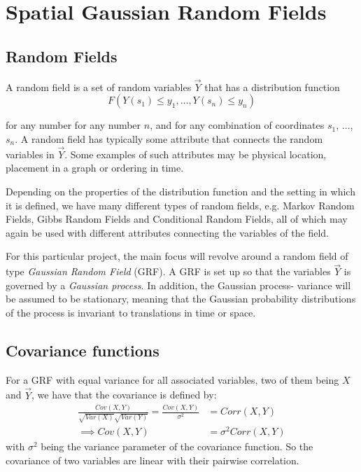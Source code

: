 \section{Spatial Gaussian Random Fields}
\subsection{Random Fields}
A random field is a set of random variables $\vec{Y}$ that has a distribution function 
\begin{equation} \label{eq:distribution_function}
F(Y(s_1) \leq y_1, \dots , Y(s_n) \leq y_n)
\end{equation} 

for any number for any number $n$, and for any combination of coordinates $s_1$, $\ldots$, $s_n$. A random field has typically some attribute that connects the random variables in $\vec{Y}$. Some examples of such attributes may be physical location, placement in a graph or ordering in time.

Depending on the properties of the distribution function and the setting in which it is defined, we have many different types of random fields, e.g. Markov Random Fields, Gibbs Random Fields and Conditional Random Fields, all of which may again be used with different attributes connecting the variables of the field. 

For this particular project, the main focus will revolve around a random field of type \textit{Gaussian Random Field} (GRF). A GRF is set up so that the variables $\vec{Y}$ is governed by a \textit{Gaussian process}. In addition, the Gaussian process- variance will be assumed to be stationary, meaning that the Gaussian probability distributions of the process is invariant to translations in time or space.

\subsection{Covariance functions} \label{sec:covariance_functions}

For a GRF with equal variance for all associated variables, two of them being $X$ and $\vec{Y}$, we have that the covariance is defined by:
\begin{align*}
\frac{Cov( X, Y )}{\sqrt{Var( X )}\sqrt{Var( Y )}} = \frac{Cov( X, Y )}{\sigma^2} &= Corr(X, Y) \\
\implies  Cov( X, Y ) &= \sigma^2 Corr(X, Y)
\end{align*}
with $\sigma^2$ being the variance parameter of the covariance function. So the covariance of two variables are linear with their pairwise correlation. 

